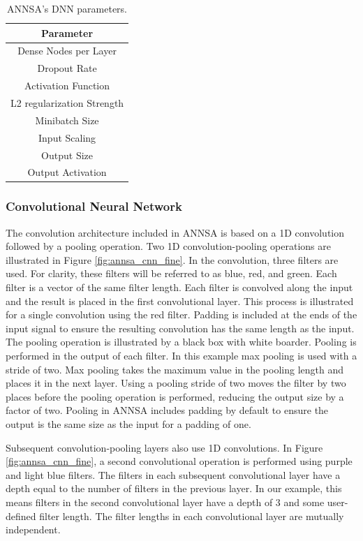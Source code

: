 \begin{table}[H]
\centering
\caption{ANNSA's DNN parameters.}
\begin{tabular}{c}
\hline
Parameter \\ \hline
Dense Nodes per Layer \\
Dropout Rate \\
Activation Function \\
L2 regularization Strength \\ 
Minibatch Size \\ 
Input Scaling \\
Output Size \\
Output Activation \\ \hline
\end{tabular}
\label{table:annsa_dnn_params}
\end{table}


\subsubsection{Convolutional Neural Network} \label{annsa_section_conv_neural_network}

The convolution architecture included in ANNSA is based on a 1D convolution followed by a pooling operation. Two 1D convolution-pooling operations are illustrated in Figure \ref{fig:annsa_cnn_fine}. In the convolution, three filters are used. For clarity, these filters will be referred to as blue, red, and green. Each filter is a vector of the same filter length. Each filter is convolved along the input and the result is placed in the first convolutional layer. This process is illustrated for a single convolution using the red filter. Padding is included at the ends of the input signal to ensure the resulting convolution has the same length as the input. The pooling operation is illustrated by a black box with white boarder. Pooling is performed in the output of each filter. In this example max pooling is used with a stride of two. Max pooling takes the maximum value in the pooling length and places it in the next layer. Using a pooling stride of two moves the filter by two places before the pooling operation is performed, reducing the output size by a factor of two. Pooling in ANNSA includes padding by default to ensure the output is the same size as the input for a padding of one.

Subsequent convolution-pooling layers also use 1D convolutions. In Figure \ref{fig:annsa_cnn_fine}, a second convolutional operation is performed using purple and light blue filters. The filters in each subsequent convolutional layer have a depth equal to the number of filters in the previous layer. In our example, this means filters in the second convolutional layer have a depth of 3 and some user-defined filter length. The filter lengths in each convolutional layer are mutually independent.



